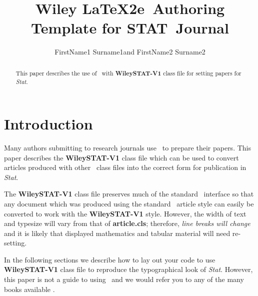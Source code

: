 \documentclass[cmbright]{WileySTAT-V1} %
\theoremstyle{plain}
\begin{document}
\title{Wiley \LaTeX2e\ Authoring Template for STAT~Journal}

\author{FirstName1 Surname1\corrauth and
        FirstName2 Surname2}

\address{%
First authors's address \\
Second author's address}


\begin{abstract}
This paper describes the use of \LaTeXe\ with \textbf{WileySTAT-V1} class file for setting papers for \textit{Stat}.
\end{abstract}


\maketitle

\section{Introduction}\label{sec1}

Many authors submitting to research journals use \LaTeXe\ to prepare their papers. This paper describes the \textbf{WileySTAT-V1} class file which can be used to convert articles produced with other \LaTeXe\ class files into the correct form for publication in \textit{Stat}.

The \textbf{WileySTAT-V1} class file preserves much of the standard \LaTeXe\ interface so that any document which was produced using the standard \LaTeXe\ article style can easily be converted to work with the \textbf{WileySTAT-V1} style. However, the width of text and typesize will vary from that of \textbf{article.cls}; therefore, \emph{line breaks will change} and it is likely that displayed mathematics and tabular material will need re-setting.

In the following sections we describe how to lay out your code to use \textbf{WileySTAT-V1} class file to reproduce the typographical look of \textit{Stat}. However, this paper is not a guide to using \LaTeXe\ and we would refer you to any of the many books available \citep[see, for example,][]{R1,R2,R3}.
\end{document}

